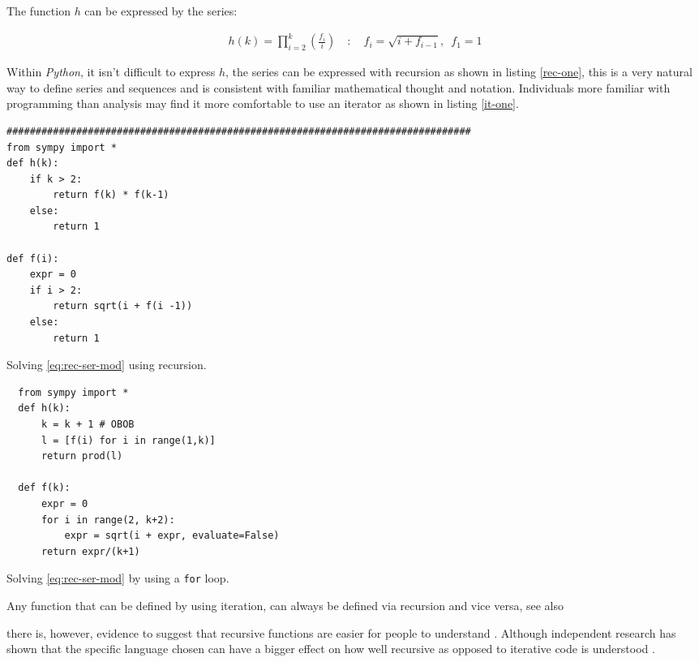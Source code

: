 \documentclass[11pt]{article}
\begin{document}
The function \(h\) can be expressed by the series:

$$\begin{aligned}
h\left( k \right) = \prod^k_{i = 2} \left( \frac{f_i}{i}  \right)  \quad : \quad f_i = \sqrt{i +  f_{i - 1}}, \enspace f_{1} = 1
\end{aligned}$$

Within \emph{Python}, it isn't difficult to express \(h\), the series can be expressed with recursion as shown in listing \ref{rec-one}, this is a very natural way to define series and sequences and is consistent with familiar mathematical thought and notation. Individuals more familiar with programming than analysis may find it more comfortable to use an iterator as shown in listing \ref{it-one}.

\begin{listing}[htbp]
\begin{verbatim}
################################################################################
from sympy import *
def h(k):
    if k > 2:
        return f(k) * f(k-1)
    else:
        return 1

def f(i):
    expr = 0
    if i > 2:
        return sqrt(i + f(i -1))
    else:
        return 1
\end{verbatim}
\caption{\label{rec-one}Solving \eqref{eq:rec-ser-mod} using recursion.}
\end{listing}


\begin{listing}[htbp]
\begin{verbatim}
  from sympy import *
  def h(k):
      k = k + 1 # OBOB
      l = [f(i) for i in range(1,k)]
      return prod(l)

  def f(k):
      expr = 0
      for i in range(2, k+2):
          expr = sqrt(i + expr, evaluate=False)
      return expr/(k+1)
\end{verbatim}
\caption{\label{it-one}Solving \eqref{eq:rec-ser-mod} by using a \texttt{for} loop.}
\end{listing}

Any function that can be defined by using iteration, can always be defined via
recursion and vice versa,
\cite{bohmReducingRecursionIteration1988,bohmReducingRecursionIteration1986}
see also
\cite{smolarskiMath60Notes2000,IterationVsRecursion2016}

there is, however, evidence to suggest that recursive functions are easier for people to understand \cite{benanderEmpiricalAnalysisDebugging2000} . Although independent research has shown that the specific language chosen can have a bigger effect on how well recursive as opposed to iterative code is understood \cite{sinhaCognitiveFitEmpirical1992}.
\end{document}
